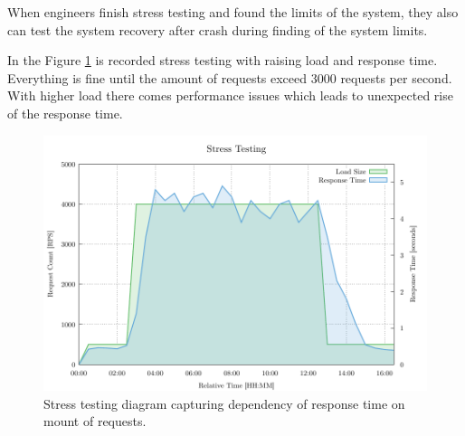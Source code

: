 When engineers finish stress testing and found the limits of the system, they also can test the system recovery after crash during finding of the system limits.

In the Figure \ref{fig:stress_test} is recorded stress testing with raising load and response time. Everything is fine until the amount of requests exceed 3000 requests per second. With higher load there comes performance issues which leads to unexpected rise of the response time.

\begin{figure}[H]
  \centering
  \includegraphics[width=15cm]{obrazky-figures/stress_testing.pdf}
  \caption{Stress testing diagram capturing dependency of response time on mount of requests.}
  \label{fig:stress_test}
\end{figure}


